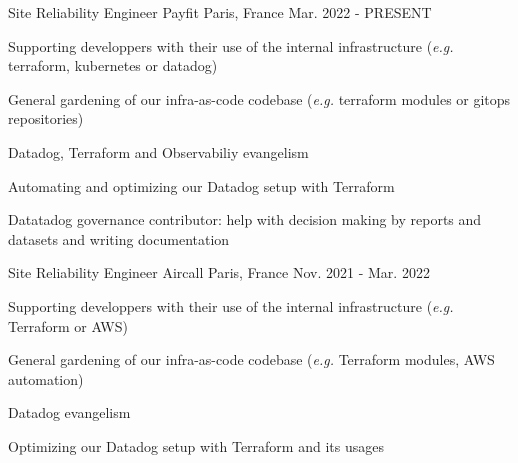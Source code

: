 

\begin{cventries}

  \cventry
    {Site Reliability Engineer} %
    {Payfit} %
    {Paris, France} %
    {Mar. 2022 - PRESENT} %
    {
      \begin{cvitems} %
        \item {Supporting developpers with their use of the internal infrastructure (\emph{e.g.} terraform, kubernetes or datadog)}
        \item {General gardening of our infra-as-code codebase (\emph{e.g.} terraform modules or gitops repositories)}
        \item {Datadog, Terraform and Observabiliy evangelism}
        \item {Automating and optimizing our Datadog setup with Terraform}
        \item {Datatadog governance contributor: help with decision making by reports and datasets and writing documentation }
      \end{cvitems}
    }

  \cventry
    {Site Reliability Engineer} %
    {Aircall} %
    {Paris, France} %
    {Nov. 2021 - Mar. 2022} %
    {
      \begin{cvitems} %
        \item {Supporting developpers with their use of the internal infrastructure (\emph{e.g.} Terraform or AWS)}
        \item {General gardening of our infra-as-code codebase (\emph{e.g.} Terraform modules, AWS automation)}
        \item {Datadog evangelism}
        \item {Optimizing our Datadog setup with Terraform and its usages}
      \end{cvitems}
    }


\end{cventries}
